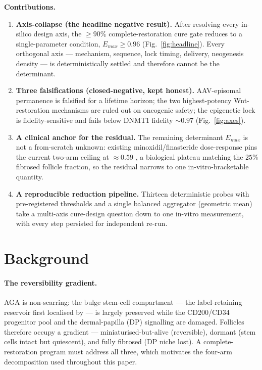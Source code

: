 \documentclass[11pt,a4paper]{article}
\begin{document}
\medskip
\noindent\textbf{Contributions.}
\begin{enumerate}\itemsep0.3em
\item \textbf{Axis-collapse (the headline negative result).} After resolving every
in-silico design axis, the $\geq 90\%$ complete-restoration cure gate reduces to a
single-parameter condition, $E_{max}\geq 0.96$ (Fig.~\ref{fig:headline}). Every
orthogonal axis --- mechanism, sequence, lock timing, delivery, neogenesis density
--- is deterministically settled and therefore cannot be the determinant.
\item \textbf{Three falsifications (closed-negative, kept honest).} AAV-episomal
permanence is falsified for a lifetime horizon; the two highest-potency
Wnt-restoration mechanisms are ruled out on oncogenic safety; the epigenetic lock
is fidelity-sensitive and fails below DNMT1 fidelity ${\sim}0.97$
(Fig.~\ref{fig:axes}).
\item \textbf{A clinical anchor for the residual.} The remaining determinant
$E_{max}$ is not a from-scratch unknown: existing minoxidil/finasteride
dose-response pins the current two-arm ceiling at $\approx 0.59$
\citep{vanneste2020}, a biological plateau matching the $25\%$ fibrosed follicle
fraction, so the residual narrows to one in-vitro-bracketable quantity.
\item \textbf{A reproducible reduction pipeline.} Thirteen deterministic probes
with pre-registered thresholds and a single balanced aggregator (geometric mean)
take a multi-axis cure-design question down to one in-vitro measurement, with every
step persisted for independent re-run.
\end{enumerate}

\section{Background}
\label{sec:bg}

\paragraph{The reversibility gradient.} AGA is non-scarring: the bulge stem-cell
compartment --- the label-retaining reservoir first localised by
\citet{cotsarelis1990} --- is largely preserved while the CD200/CD34 progenitor
pool and the dermal-papilla (DP) signalling are damaged. Follicles therefore occupy a gradient
--- miniaturised-but-alive (reversible), dormant (stem cells intact but quiescent),
and fully fibrosed (DP niche lost). A complete-restoration program must address all
three, which motivates the four-arm decomposition used throughout this paper.
\end{document}
